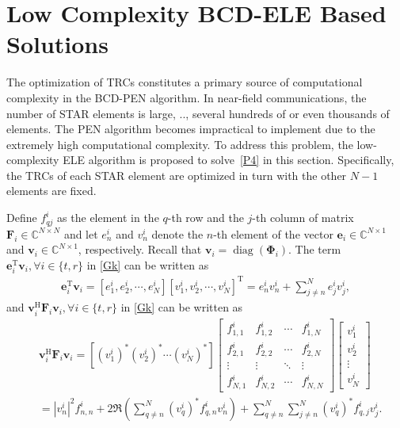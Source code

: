 \documentclass[12pt, draftclsnofoot, onecolumn]{IEEEtran}
\DeclareMathOperator{\diag}{diag}
\newcommand{\eg}{\text{e}.\text{g}.}
\begin{document}
\section{Low Complexity BCD-ELE Based Solutions}
The optimization of TRCs constitutes a primary source of computational complexity in the BCD-PEN algorithm. In near-field communications, the number of STAR elements is large, \eg, several hundreds of or even thousands of elements. The PEN algorithm becomes impractical to implement due to the extremely high computational complexity. To address this problem, the low-complexity ELE algorithm is proposed to solve~\eqref{P4} in this section. Specifically, the TRCs of each STAR element are optimized in turn with the other $N-1$ elements are fixed. 

Define $f^i_{qj}$ as the element in the $q$-th row and the $j$-th column of matrix $\mathbf{F}_i\in\mathbb{C}^{N\times N}$ and let $e_n^i$ and $v_n^i$ denote the $n$-th element of the vector $\mathbf{e}_i\in\mathbb{C}^{N\times 1}$ and $\mathbf{v}_i\in\mathbb{C}^{N\times 1}$, respectively. Recall that $\mathbf{v}_{i}=\diag\left(\mathbf{\Phi}_{i}\right)$. The term $\mathbf{e}_i^\mathrm{T}\mathbf{v}_i, \forall i\in\{t,r\}$ in \eqref{Gk} can be written as
\begin{equation}\label{e_expand}
\begin{aligned}
\mathbf{e}_i^\mathrm{T}\mathbf{v}_i=\left[e_1^{i},  e_2^{i},  \cdots,  e_N^{i}\right]\left[v_1^{i}, v_2^{i}, \cdots, v_N^{i}\right]^\mathrm{T}= e_n^i v_n^{i} + \sum\nolimits_{j\neq n}^N e_{j}^i v_j^{i},
\end{aligned}
\end{equation}
and $\mathbf{v}_i^\mathrm{H}\mathbf{F}_i\mathbf{v}_i, \forall i\in\{t,r\}$ in \eqref{Gk} can be written as
\begin{equation}\label{F_expand}
\begin{aligned}
&\mathbf{v}_i^\mathrm{H}\mathbf{F}_i\mathbf{v}_i=\left[(v_1^{i})^*  (v_2^{i})^*  \cdots  (v_N^{i})^*\right]
\begin{bmatrix}
f_{1,1}^i & f_{1,2}^i & \cdots & f_{1,N}^i\\
f_{2,1}^i & f_{2,2}^i & \cdots & f_{2,N}^i\\
\vdots & \vdots & \ddots & \vdots\\
f_{N,1}^i & f_{N,2}^i & \cdots & f_{N,N}^i
\end{bmatrix}
\begin{bmatrix}
v_1^{i}\\
v_2^{i}\\
\vdots\\
v_N^{i}
\end{bmatrix}\\
&=\left|v_n^{i}\right|^2 f_{n,n}^i + 2\Re\left(\sum_{q\neq n}^N (v_q^{i})^* f_{q,n}^i v_n^{i}\right) + \sum_{q\neq n}^N\sum_{j\neq n}^N (v_q^{i})^* f_{q,j}^iv_j^{i}.
\end{aligned}
\end{equation}
\end{document}

